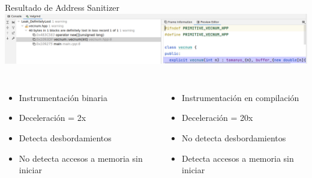 \begin{frame}[t,fragile]{Resultado de Address Sanitizer}
\includegraphics[width=\textwidth]{images/01-constr-destr/vecnum-ctor-valgrind.png}

\begin{columns}[T]
\begin{itemize}
  \item Instrumentación binaria
  \item Deceleración = 2x
  \item Detecta desbordamientos
  \item No detecta accesos a memoria sin iniciar
\end{itemize}

\begin{itemize}
  \item Instrumentación en compilación
  \item Deceleración = 20x
  \item No detecta desbordamientos
  \item Detecta accesos a memoria sin iniciar
\end{itemize}

\end{columns}
\end{frame}
